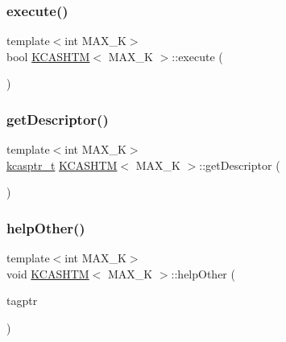 \mbox{\label{classKCASHTM_a3cbdb60b25f482567d6be0d3d545a6ea}} 
\subsubsection{\texorpdfstring{execute()}{execute()}}
{\footnotesize\ttfamily template$<$int M\+A\+X\+\_\+K$>$ \\
bool \hyperlink{classKCASHTM}{K\+C\+A\+S\+H\+TM}$<$ M\+A\+X\+\_\+K $>$\+::execute (\begin{DoxyParamCaption}{ }\end{DoxyParamCaption})}

\mbox{\label{classKCASHTM_a410b6c7f87aed36478dc7adc9c54478f}} 
\subsubsection{\texorpdfstring{get\+Descriptor()}{getDescriptor()}}
{\footnotesize\ttfamily template$<$int M\+A\+X\+\_\+K$>$ \\
\hyperlink{kcas__reuse__impl_8h_a5bbc81d391bfd6b4288a0d33f105a0b2}{kcasptr\+\_\+t} \hyperlink{classKCASHTM}{K\+C\+A\+S\+H\+TM}$<$ M\+A\+X\+\_\+K $>$\+::get\+Descriptor (\begin{DoxyParamCaption}{ }\end{DoxyParamCaption})}

\mbox{\label{classKCASHTM_a6a53e2832b8e53b09c3ab147309fe645}} 
\subsubsection{\texorpdfstring{help\+Other()}{helpOther()}}
{\footnotesize\ttfamily template$<$int M\+A\+X\+\_\+K$>$ \\
void \hyperlink{classKCASHTM}{K\+C\+A\+S\+H\+TM}$<$ M\+A\+X\+\_\+K $>$\+::help\+Other (\begin{DoxyParamCaption}\item[{\hyperlink{kcas__reuse__impl_8h_a22868433cf4300ce32f000ed8c8dd76c}{kcastagptr\+\_\+t}}]{tagptr }\end{DoxyParamCaption})}

